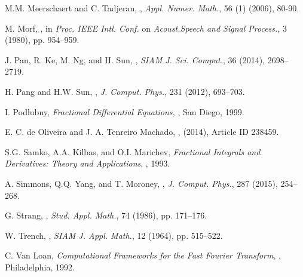 \documentclass{ecnumaster}
\begin{document}
\begin{thebibliography}{99}
\newblock M.M. Meerschaert and C. Tadjeran,
,
\newblock \emph{Appl. Numer. Math.}, 56 (1) (2006), 80-90.

\newblock M. Morf,
,
\newblock in \emph{Proc. IEEE Intl. Conf.} on \emph{Acoust.Speech and Signal Process.}, 3 (1980), pp. 954--959.

\newblock J. Pan, R. Ke, M. Ng, and H. Sun,
,
\newblock \emph{SIAM J. Sci. Comput.}, 36 (2014), 2698--2719.

\newblock H. Pang and H.W. Sun,
,
\newblock \emph{J. Comput. Phys.}, 231 (2012), 693--703.

\newblock I. Podlubny,
\newblock \emph{Fractional Differential Equations,}
, San Diego, 1999.

\newblock E. C. de Oliveira and J. A. Tenreiro Machado,
,
 (2014), Article ID 238459.

\newblock S.G. Samko, A.A. Kilbas, and O.I. Marichev,
\newblock \emph{Fractional Integrals and Derivatives: Theory and Applications},
, 1993.

\newblock A. Simmons, Q.Q. Yang, and T. Moroney,
,
\newblock \emph{J. Comput. Phys.}, 287 (2015), 254--268.

\newblock G. Strang,
,
\newblock \emph{Stud. Appl. Math.}, 74 (1986), pp. 171--176.

\newblock W. Trench,
,
\newblock \emph{SIAM J. Appl. Math.}, 12 (1964), pp. 515--522.

\newblock C. Van Loan,
\newblock \emph{Computational Frameworks for the Fast Fourier Transform},
, Philadelphia, 1992.


\end{thebibliography}
\end{document}
